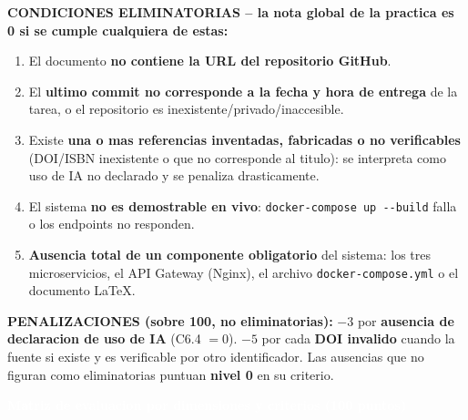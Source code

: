 \documentclass[10pt]{article}
\newcommand{\titulobanner}[1]{%
\begin{tcolorbox}[colback=azulOscuro,colframe=azulOscuro,boxrule=0pt,arc=2pt,left=8pt,right=8pt,top=5pt,bottom=5pt]
\textcolor{white}{\large\textbf{#1}}
\end{tcolorbox}}
\begin{document}
\vspace{3pt}
\begin{tcolorbox}[colback=rojoElim!6,colframe=rojoElim,boxrule=1pt,arc=2pt,left=7pt,right=7pt,top=4pt,bottom=4pt]
\footnotesize
\textbf{\textcolor{rojoElim}{CONDICIONES ELIMINATORIAS -- la nota global de la practica es 0 si se cumple cualquiera de estas:}}
\begin{enumerate}[leftmargin=1.4em,itemsep=1pt,topsep=2pt]
\item El documento \textbf{no contiene la URL del repositorio GitHub}.
\item El \textbf{ultimo commit no corresponde a la fecha y hora de entrega} de la tarea, o el repositorio es inexistente/privado/inaccesible.
\item Existe \textbf{una o mas referencias inventadas, fabricadas o no verificables} (DOI/ISBN inexistente o que no corresponde al titulo): se interpreta como uso de IA no declarado y se penaliza drasticamente.
\item El sistema \textbf{no es demostrable en vivo}: \texttt{docker-compose up -{}-build} falla o los endpoints no responden.
\item \textbf{Ausencia total de un componente obligatorio} del sistema: los tres microservicios, el API Gateway (Nginx), el archivo \texttt{docker-compose.yml} o el documento LaTeX.
\end{enumerate}
\end{tcolorbox}

\vspace{2pt}
\begin{tcolorbox}[colback=naranjaPen!7,colframe=naranjaPen,boxrule=0.8pt,arc=2pt,left=7pt,right=7pt,top=3pt,bottom=3pt]
\footnotesize
\textbf{\textcolor{naranjaPen}{PENALIZACIONES (sobre 100, no eliminatorias):}} \;
$-3$ por \textbf{ausencia de declaracion de uso de IA} (C6.4 $=0$). \quad
$-5$ por cada \textbf{DOI invalido} cuando la fuente si existe y es verificable por otro identificador. \quad
Las ausencias que no figuran como eliminatorias puntuan \textbf{nivel 0} en su criterio.
\end{tcolorbox}

\clearpage
\titulobanner{Matriz de evaluacion por dimensiones y criterios (100 puntos)}
\vspace{3pt}
\end{document}
